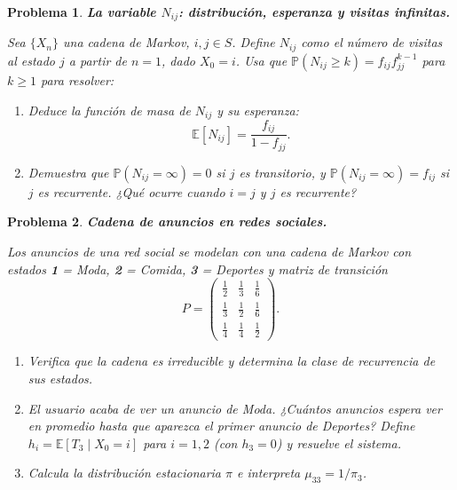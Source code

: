 \documentclass[12pt]{article}
\newtheorem{problem}{Problema}
\begin{document}
\begin{problem}
\textbf{La variable $N_{ij}$: distribución, esperanza y visitas infinitas.}

Sea $\{X_n\}$ una cadena de Markov, $i, j \in S$. Define $N_{ij}$ como el número de visitas al estado $j$ a partir de $n = 1$, dado $X_0 = i$. Usa que $\mathbb{P}(N_{ij} \ge k) = f_{ij} f_{jj}^{k-1}$ para $k \ge 1$ para resolver:

\begin{enumerate}
    \item[(a)] Deduce la función de masa de $N_{ij}$ y su esperanza:
    \[
        \mathbb{E}[N_{ij}] = \frac{f_{ij}}{1 - f_{jj}}.
    \]

    \item[(b)] Demuestra que $\mathbb{P}(N_{ij} = \infty) = 0$ si $j$ es transitorio, y $\mathbb{P}(N_{ij} = \infty) = f_{ij}$ si $j$ es recurrente. ¿Qué ocurre cuando $i = j$ y $j$ es recurrente?
\end{enumerate}
\end{problem}

\begin{problem}
\textbf{Cadena de anuncios en redes sociales.}

Los anuncios de una red social se modelan con una cadena de Markov con estados \textbf{1} = Moda, \textbf{2} = Comida, \textbf{3} = Deportes y matriz de transición
\[
    P = \begin{pmatrix}
        \tfrac{1}{2} & \tfrac{1}{3} & \tfrac{1}{6} \\[4pt]
        \tfrac{1}{3} & \tfrac{1}{2} & \tfrac{1}{6} \\[4pt]
        \tfrac{1}{4} & \tfrac{1}{4} & \tfrac{1}{2}
    \end{pmatrix}.
\]

\begin{enumerate}
    \item[(a)] Verifica que la cadena es irreducible y determina la clase de recurrencia de sus estados.

    \item[(b)] El usuario acaba de ver un anuncio de Moda. ¿Cuántos anuncios espera ver en promedio hasta que aparezca el primer anuncio de Deportes? Define $h_i = \mathbb{E}[T_3 \mid X_0 = i]$ para $i = 1, 2$ (con $h_3 = 0$) y resuelve el sistema.

    \item[(c)] Calcula la distribución estacionaria $\pi$ e interpreta $\mu_{33} = 1/\pi_3$.
\end{enumerate}
\end{problem}
\end{document}
